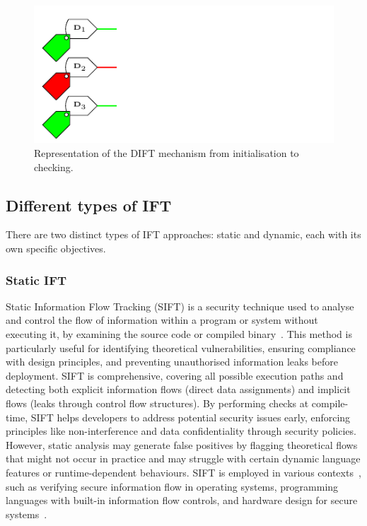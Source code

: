 \begin{figure}[ht]
    \centering
    \includegraphics[page=3]{c2_soa/img/schemaDIFT.pdf}
    \caption{Representation of the DIFT mechanism from initialisation to checking.}
    \label{fig:dift_init}
\end{figure}
    
\subsection{Different types of IFT}
There are two distinct types of IFT approaches: static and dynamic, each with its own specific objectives.

\subsubsection{Static IFT}
Static Information Flow Tracking (SIFT) is a security technique used to analyse and control the flow of information within a program or system without executing it, by examining the source code or compiled binary~\cite{HAK-21-acmcsur}. This method is particularly useful for identifying theoretical vulnerabilities, ensuring compliance with design principles, and preventing unauthorised information leaks before deployment. SIFT is comprehensive, covering all possible execution paths and detecting both explicit information flows (direct data assignments) and implicit flows (leaks through control flow structures). By performing checks at compile-time, SIFT helps developers to address potential security issues early, enforcing principles like non-interference and data confidentiality through security policies. However, static analysis may generate false positives by flagging theoretical flows that might not occur in practice and may struggle with certain dynamic language features or runtime-dependent behaviours. SIFT is employed in various contexts~\cite{LMLW-08-pepm}, such as verifying secure information flow in operating systems, programming languages with built-in information flow controls, and hardware design for secure systems~\cite{FXZMS-17-sigarch}.

